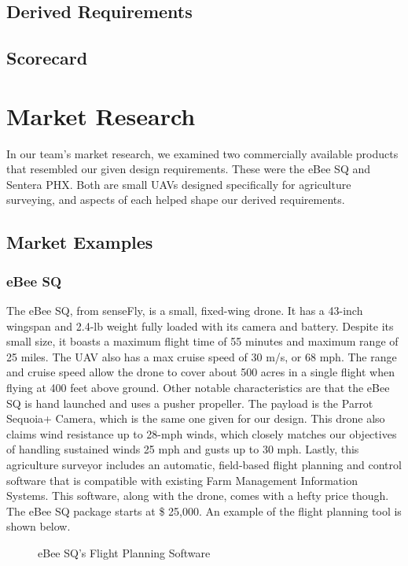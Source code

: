 \documentclass[letterpaper,12pt]{article}
\begin{document}
\subsection{Derived Requirements}\label{sec:req:der}


\subsection{Scorecard}\label{sec:req:sc}


\section{Market Research}\label{sec:research} %
In our team's market research, we examined two commercially available products that resembled our given design requirements. These were the eBee SQ and Sentera PHX. Both are small UAVs designed specifically for agriculture surveying, and aspects of each helped shape our derived requirements. 

\subsection{Market Examples}
\subsubsection{eBee SQ} 
The eBee SQ, from senseFly, is a small, fixed-wing drone. It has a 43-inch wingspan and 2.4-lb weight fully loaded with its camera and battery. Despite its small size, it boasts a maximum flight time of 55 minutes and maximum range of 25 miles. The UAV also has a max cruise speed of 30 m/s, or 68 mph. The range and
cruise speed allow the drone to cover about 500 acres in a single flight when flying at 400 feet
above ground. Other notable characteristics are that the eBee SQ is hand launched and uses a
pusher propeller. 
The payload is the Parrot Sequoia+ Camera, which is the same one given for our design. This drone also claims wind resistance up to 28-mph winds, which closely matches our objectives of handling sustained winds 25 mph and gusts up to 30 mph.
Lastly, this agriculture surveyor includes an automatic, field-based flight planning and control
software that is compatible with existing Farm Management Information Systems. This software, along with the drone, comes with a hefty price though. The eBee SQ package starts at \$ 25,000. An example of the flight planning tool is shown below. 
\begin{figure}
    \centering
    \caption{eBee SQ's Flight Planning Software}
    \label{fig:ebee_flightplanner}
\end{figure}
\end{document}
